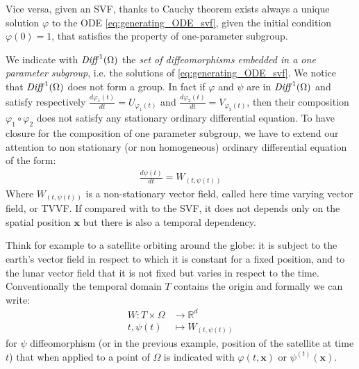 Vice versa, given an SVF, thanks to Cauchy theorem exists always a unique solution $\varphi$ to the ODE \ref{eq:generating_ODE_svf}, given the initial condition $\varphi(0) = 1$, that satisfies the property of one-parameter subgroup.

We indicate with $\text{\emph{Diff}}^{1}(\Omega)$ the \emph{set of diffeomorphisms embedded in a one parameter subgroup}, i.e. the solutions of \ref{eq:generating_ODE_svf}. We notice that $\text{\emph{Diff}}^{1}(\Omega)$ does not form a group. In fact if $\varphi$ and $\psi$ are in $\text{\emph{Diff}}^{1}(\Omega)$ and satisfy respectively $\frac{d\varphi_1(t)}{dt} = U_{\varphi_1(t)}$ and $\frac{d\varphi_2(t)}{dt} = V_{\varphi_2(t)}$, then their composition $\varphi_1\circ\varphi_2$ does not satisfy any stationary ordinary differential equation. 
To have closure for the composition of one parameter subgroup, we have to extend our attention to non stationary (or non homogeneous) ordinary differential equation of the form:
\begin{align}\label{eq:generating_ODE_tvvf}
\frac{d\psi(t)}{dt} = W_{(t, \psi(t))}
\end{align}
Where $W_{(t, \psi(t))}$ is a non-stationary vector field, called here time varying vector field, or TVVF. If compared with to the SVF, it does not depends only on the spatial position $\mathbf{x}$ but there is also a temporal dependency. 

Think for example to a satellite orbiting around the globe: it is subject to the earth's vector field in respect to which it is constant for a fixed position, and to the lunar vector field that it is not fixed but varies in respect to the time. Conventionally the temporal domain $T$ contains the origin and formally we can write:
\begin{align*}
W : T\times \Omega & \longrightarrow  \mathbb{R}^d \\
t, \psi(t) &\longmapsto  W_{(t, \psi(t))}
\end{align*}
for $\psi$ diffeomorphism (or in the previous example, position of the satellite at time $t$) that when applied to a point of $\Omega$ is indicated with $\varphi(t,\mathbf{x})$ or $\psi^{(t)}(\mathbf{x})$.

